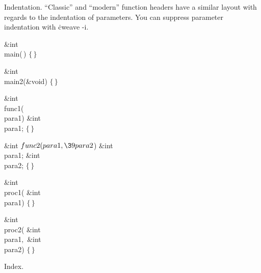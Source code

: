 

Indentation. ``Classic'' and ``modern'' function headers have a similar
layout with regards to the indentation of parameters. You can suppress
parameter indentation with \.{cweave -i}.

\Y\B\1\1\&{int} \\{main}(\,)\2\2\6
${}\{\,\}{}$\par
\fi

\B\1\1\&{int} \\{main2}(\&{void})\2\2\6
${}\{\,\}{}$\par
\fi

\B\1\1\&{int} \\{func1}(\\{para1})\6
\&{int} \\{para1};\2\2\6
${}\{\,\}{}$\par
\fi

\B\1\1\&{int} ${}\\{func2}(\\{para1},\39\\{para2}{}$)\6
\&{int} \\{para1};\6
\&{int} \\{para2};\2\2\6
${}\{\,\}{}$\par
\fi

\B\1\1\&{int} \\{proc1}(\6
\&{int} \\{para1})\2\2\6
${}\{\,\}{}$\par
\fi

\B\1\1\&{int} \\{proc2}(\6
\&{int} \\{para1}${},{}$\6
\&{int} \\{para2})\2\2\6
${}\{\,\}{}$\par
\fi

Index.
\fi

\inx
\fin
\con
